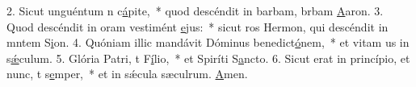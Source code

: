 2. Sicut unguéntum n c\uline{á}pite,~* quod descéndit in barbam, brbam \uline{A}aron.
3. Quod descéndit in oram vestimént \uline{e}jus:~* sicut ros Hermon, qui descéndit in mntem S\uline{i}on.
4. Quóniam illic mandávit Dóminus benedict\uline{ó}nem,~* et vitam us in s\uline{ǽ}culum.
5. Glória Patri, t F\uline{í}lio,~* et Spiríti S\uline{a}ncto.
6. Sicut erat in princípio, et nunc, t s\uline{e}mper,~* et in sǽcula sæculrum. \uline{A}men.
